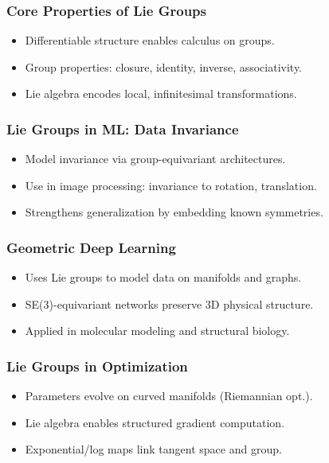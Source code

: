 \begin{frame}[fragile]\frametitle{Core Properties of Lie Groups}
  \begin{itemize}
    \item Differentiable structure enables calculus on groups.
    \item Group properties: closure, identity, inverse, associativity.
    \item Lie algebra encodes local, infinitesimal transformations.
  \end{itemize}
\end{frame}

\begin{frame}[fragile]\frametitle{Lie Groups in ML: Data Invariance}
  \begin{itemize}
    \item Model invariance via group-equivariant architectures.
    \item Use in image processing: invariance to rotation, translation.
    \item Strengthens generalization by embedding known symmetries.
  \end{itemize}
\end{frame}

\begin{frame}[fragile]\frametitle{Geometric Deep Learning}
  \begin{itemize}
    \item Uses Lie groups to model data on manifolds and graphs.
    \item SE(3)-equivariant networks preserve 3D physical structure.
    \item Applied in molecular modeling and structural biology.
  \end{itemize}
\end{frame}

\begin{frame}[fragile]\frametitle{Lie Groups in Optimization}
  \begin{itemize}
    \item Parameters evolve on curved manifolds (Riemannian opt.).
    \item Lie algebra enables structured gradient computation.
    \item Exponential/log maps link tangent space and group.
  \end{itemize}
\end{frame}


